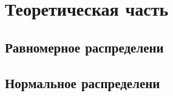 \chapter{Теоретическая часть}

\section{Равномерное распределени}

\section{Нормальное распределени}
